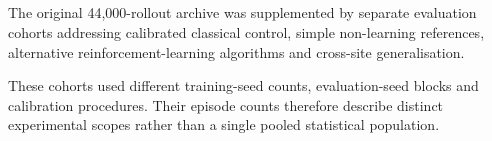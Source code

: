 \subsection{}

\begin{revisedblock}
The original 44,000-rollout archive was supplemented
by separate evaluation cohorts addressing calibrated
classical control, simple non-learning references,
alternative reinforcement-learning algorithms and
cross-site generalisation.

These cohorts used different training-seed counts,
evaluation-seed blocks and calibration procedures.
Their episode counts therefore describe distinct
experimental scopes rather than a single pooled
statistical population.
\end{revisedblock}

